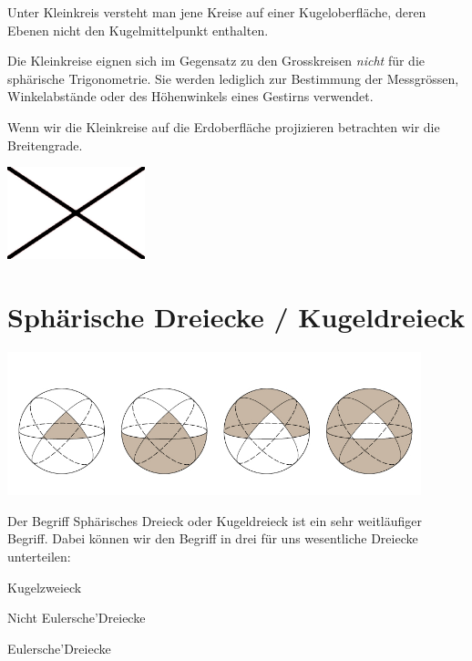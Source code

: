 \begin{refsection}
\begin{definition}
Unter Kleinkreis versteht man jene Kreise auf einer Kugeloberfläche, deren Ebenen nicht den Kugelmittelpunkt enthalten.
\end{definition}

Die Kleinkreise eignen sich im Gegensatz zu den Grosskreisen \textit{nicht} für die sphärische Trigonometrie. 
Sie werden lediglich zur Bestimmung der Messgrössen, Winkelabstände oder des Höhenwinkels eines Gestirns verwendet. 

Wenn wir die Kleinkreise auf die Erdoberfläche projizieren betrachten wir die Breitengrade.

\begin{center}
        \includegraphics[width=0.3\textwidth]{kugel/Beispielbild.jpg}
\end{center}


\section{Sphärische Dreiecke / Kugeldreieck}

\begin{center}
        \includegraphics[width=0.9\textwidth]{kugel/Dreieckarten.jpg}
\end{center}

Der Begriff Sphärisches Dreieck oder Kugeldreieck ist ein sehr weitläufiger Begriff. 
Dabei können wir den Begriff in drei für uns wesentliche Dreiecke unterteilen:\\

\begin{compactitem}
\item Kugelzweieck
\item Nicht Eulersche’Dreiecke
\item Eulersche’Dreiecke
\end{compactitem}


\end{refsection}
